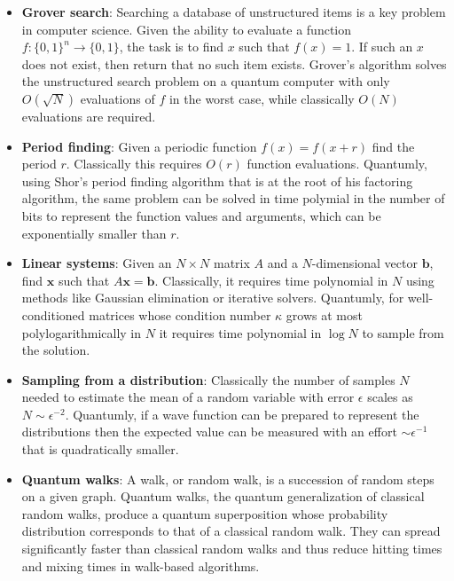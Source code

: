 \documentclass[journal]{IEEEtran}
\begin{document}
\begin{itemize}
\item {\bf Grover search}:
Searching a database of unstructured items is a key problem in computer science.  Given the ability to evaluate a function $f: \{0,1\}^n\rightarrow \{0,1\}$, the task is to find $x$ such that $f(x)=1$.  If such an $x$ does not exist, then return that no such item exists.   
Grover's algorithm solves the unstructured search problem on a quantum computer with only $O(\sqrt{N})$ evaluations of $f$ in the worst case, while classically $O(N)$ evaluations are required.  

\item {\bf Period finding}: Given a periodic function $f(x)=f(x+r)$ find the period $r$. Classically this requires $O(r)$ function evaluations. Quantumly, using Shor's period finding algorithm that is at the root of his factoring algorithm, the same problem can be solved in time polymial in the number of bits to represent the function values and arguments, which can be exponentially smaller than $r$.

\item {\bf Linear systems}: Given an $N\times N$ matrix $A$ and a $N$-dimensional vector $\mathbf{b}$, find $\mathbf{x}$ such that $A\mathbf{x}=\mathbf{b}$.
Classically, it requires time polynomial in $N$ using methods like Gaussian elimination or iterative solvers. Quantumly, for well-conditioned matrices whose condition number $\kappa$ grows at most polylogarithmically in $N$ it requires time polynomial in $\log N$ to sample from the solution. 


\item  {\bf  Sampling from a distribution}: Classically the number of samples $N$ needed to estimate the mean of a random variable with error $\epsilon$  scales as $N\sim \epsilon^{-2}$. Quantumly, if a wave function can be prepared to represent the distributions then the expected value can be measured with an effort  $\sim\epsilon^{-1}$ that is quadratically smaller.

\item       {\bf Quantum walks}:
A walk, or random walk, is a succession of random steps on a given graph. Quantum walks, the quantum generalization of classical random walks, produce a quantum superposition whose probability distribution corresponds to that of a classical random walk. They can spread significantly faster than classical random walks and thus reduce hitting times and mixing times in walk-based algorithms.



\end{itemize}
\end{document}
